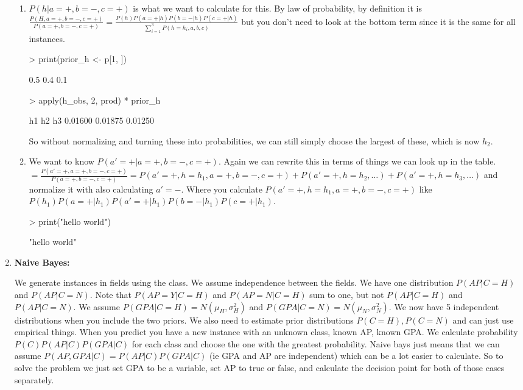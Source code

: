 \documentclass[12pt]{article}
\begin{document}
\begin{enumerate}
\begin{enumerate}
\item %
$P(h|a=+,b=-,c=+)$ is what we want to calculate for this. By law of probability, by definition it is $\frac{P(H, a=+, b=-, c=+)}{P(a=+,b=-,c=+)}=\frac{P(h)P(a=+|h)P(b=-|h)P(c=+|h)}{\sum_{i=1}^3 P(h=h_i,a,b,c)}$ but you don't need to look at the bottom term since it is the same for all instances.
\begin{Schunk}
\begin{Sinput}
> print(prior_h <- p[1, ])
\end{Sinput}
\begin{Soutput}
[1] 0.5 0.4 0.1
\end{Soutput}
\begin{Sinput}
> apply(h_obs, 2, prod) * prior_h
\end{Sinput}
\begin{Soutput}
     h1      h2      h3 
0.01600 0.01875 0.01250 
\end{Soutput}
\end{Schunk}
So without normalizing and turning these into probabilities, we can still simply choose the largest of these, which is now $h_2$.

\item %
We want to know $P(a'=+ | a=+,b=-,c=+)$. Again we can rewrite this in terms of things we can look up in the table. $=\frac{P(a'=+, a=+, b=-, c=+)}{P(a=+,b=-,c=+)} = P(a'=+, h=h_1,a=+,b=-,c=+)+P(a'=+,h=h_2,\ldots)+P(a'=+,h=h_3,\ldots)$ and normalize it with also calculating $a'=-$. Where you calculate $P(a'=+, h=h_1,a=+,b=-,c=+)$ like $P(h_1)P(a=+|h_1)P(a'=+|h_1)P(b=-|h_1)P(c=+|h_1)$.
\begin{Schunk}
\begin{Sinput}
> print("hello world")
\end{Sinput}
\begin{Soutput}
[1] "hello world"
\end{Soutput}
\end{Schunk}

\end{enumerate}
\item \textbf{Naive Bayes:}

 We generate instances in fields using the class. We assume independence between the fields. We have one distribution $P(AP|C=H)$ and $P(AP|C=N)$.  Note that $P(AP=Y|C=H)$ and $P(AP=N|C=H)$ sum to one, but not $P(AP|C=H)$ and $P(AP|C=N)$. We assume $P(GPA|C=H)=N(\mu_H,\sigma_H^2)$ and $P(GPA|C=N)=N(\mu_N,\sigma_N^2)$. We now have 5 independent distributions when you include the two priors. We also need to estimate prior distributions $P(C=H), P(C=N)$ and can just use empirical things. When you predict you have a new instance with an unknown class, known AP, known GPA. We calculate probability $P(C)P(AP|C)P(GPA|C)$ for each class and choose the one with the greatest probability. Naive bays just means that we can assume $P(AP,GPA|C) = P(AP|C)P(GPA|C)$ (ie GPA and AP are independent) which can be a lot easier to calculate. So to solve the problem we just set GPA to be a variable, set AP to true or false, and calculate the decision point for both of those cases separately.



\end{enumerate}
\end{document}
